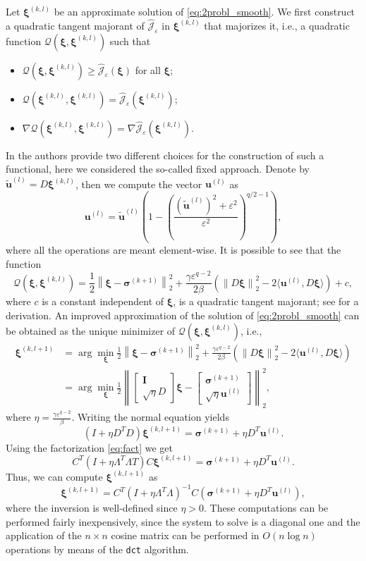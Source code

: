 \documentclass[final,leqno]{siamltex}
\newcommand{\norm}[1]{\left\| #1 \right\|}
\newcommand{\sigmab}{\boldsymbol{\sigma}}
\newcommand{\xib}{\boldsymbol{\xi}}
\begin{document}
Let $\xib^{(k,l)}$ be an approximate solution of \eqref{eq:2probl_smooth}. We first construct a quadratic tangent majorant of $\widehat{\mathcal{J}}_\varepsilon$ in $\xib^{(k,l)}$ that majorizes it, i.e., a quadratic function $\mathcal{Q}(\xib,\xib^{(k,l)})$ such that
\begin{itemize}
	\item $\mathcal{Q}(\xib,\xib^{(k,l)})\geq \widehat{\mathcal{J}}_\varepsilon(\xib)$ for all $\xib$;
	\item $\mathcal{Q}(\xib^{(k,l)},\xib^{(k,l)})= \widehat{\mathcal{J}}_\varepsilon(\xib^{(k,l)})$;
	\item$\nabla\mathcal{Q}(\xib^{(k,l)},\xib^{(k,l)})= \nabla\widehat{\mathcal{J}}_\varepsilon(\xib^{(k,l)})$.
\end{itemize}
In \cite{HLMRS17} the authors provide two different choices for the construction of such a functional, here we considered the so-called fixed approach. Denote by $\widetilde{\mathbf{u}}^{(l)}=D\xib^{(k,l)}$, then we compute the vector $\mathbf{u}^{(l)}$ as
$$
\mathbf{u}^{(l)}=\widetilde{\mathbf{u}}^{(l)}\left(1-\left(\frac{(\widetilde{\mathbf{u}}^{(l)})^2+\varepsilon^2}{\varepsilon^2}\right)^{q/2-1}\right),
$$
where all the operations are meant element-wise. It is possible to see that the function 
$$
\mathcal{Q}(\xib,\xib^{(k,l)})=\frac{1}{2}\norm{\xib-\sigmab^{(k+1)}}_2^2+\frac{\gamma\varepsilon^{q-2}}{2\beta}\left(\norm{{D}\xib}_2^2-2\langle\mathbf{u}^{(l)},{D}\xib\rangle\right)+c,
$$
where $c$ is a constant independent of $\xib$, is a quadratic tangent majorant; see \cite{HLMRS17} for a derivation. An improved approximation of the solution of \eqref{eq:2probl_smooth} can be obtained as the unique minimizer of $\mathcal{Q}(\xib,\xib^{(k,l)})$, i.e., 
\begin{align*}
\xib^{(k,l+1)}&=\arg\min_{\xib}\frac{1}{2}\norm{\xib-{\sigmab}^{(k+1)}}_2^2+\frac{\gamma\varepsilon^{q-2}}{2\beta}\left(\norm{D\xib}_2^2-2\langle\mathbf{u}^{(l)},{D}\xib\rangle\right)\\
&=\arg\min_{\xib}\frac{1}{2}\norm{\begin{bmatrix}
\mathbf{I}\\\sqrt{\eta}{D}
\end{bmatrix}\xib-\begin{bmatrix} {\sigmab^{(k+1)}}\\\sqrt{\eta}\mathbf{u}^{(l)}\end{bmatrix}}_2^2,
\end{align*}
where $\eta=\frac{\gamma\varepsilon^{q-2}}{\beta}$. Writing the normal equation yields
$$
({I}+\eta{D}^T{D})\xib^{(k,l+1)}=\sigmab^{(k+1)}+\eta D^T\mathbf{u}^{(l)}.
$$
Using the factorization \eqref{eq:fact} we get
$$
{C}^T\left({I}+\eta{\Lambda}^T{\Lambda}T\right){C}\xib^{(k,l+1)}=\sigmab^{(k+1)}+\eta {D}^T\mathbf{u}^{(l)}.
$$
Thus, we can compute $\xib^{(k,l+1)}$ as
$$
\xib^{(k,l+1)}={C}^T\left({I}+\eta\Lambda^T\Lambda\right)^{-1}{C}(\sigmab^{(k+1)}+\eta {D}^T\mathbf{u}^{(l)}),
$$
where the inversion is well-defined since $\eta>0$. These computations can be performed fairly inexpensively, since the system to solve is a diagonal one and the application of the $n\times n$ cosine matrix can be performed in $O(n\log n)$ operations by means of the \texttt{dct} algorithm.
\end{document}
